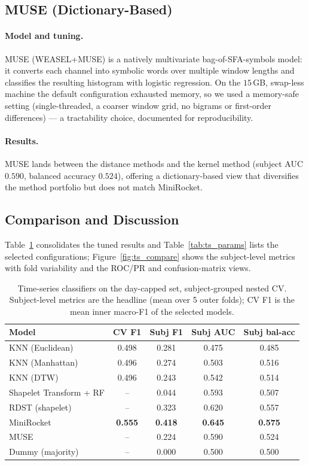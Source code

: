 \subsection{MUSE (Dictionary-Based)}
\paragraph{Model and tuning.} MUSE (WEASEL+MUSE) is a natively multivariate bag-of-SFA-symbols model: it converts each channel into symbolic words over multiple window lengths and classifies the resulting histogram with logistic regression. On the $15$\,GB, swap-less machine the default configuration exhausted memory, so we used a memory-safe setting (single-threaded, a coarser window grid, no bigrams or first-order differences) --- a tractability choice, documented for reproducibility.

\paragraph{Results.} MUSE lands between the distance methods and the kernel method (subject AUC $0.590$, balanced accuracy $0.524$), offering a dictionary-based view that diversifies the method portfolio but does not match MiniRocket.

\subsection{Comparison and Discussion}
Table~\ref{tab:ts_clf} consolidates the tuned results and Table~\ref{tab:ts_params} lists the selected configurations; Figure~\ref{fig:ts_compare} shows the subject-level metrics with fold variability and the ROC/PR and confusion-matrix views.

\begin{table}[H]
\centering
\small
\caption{Time-series classifiers on the day-capped set, subject-grouped nested CV. Subject-level metrics are the headline (mean over 5 outer folds); CV F1 is the mean inner macro-F1 of the selected models.}
\label{tab:ts_clf}
\begin{tabular}{l c c c c}
\hline
Model & CV F1 & Subj F1 & Subj AUC & Subj bal-acc \\
\hline
KNN (Euclidean) & 0.498 & 0.281 & 0.475 & 0.485 \\
KNN (Manhattan) & 0.496 & 0.274 & 0.503 & 0.516 \\
KNN (DTW) & 0.496 & 0.243 & 0.542 & 0.514 \\
Shapelet Transform + RF & -- & 0.044 & 0.593 & 0.507 \\
RDST (shapelet) & -- & 0.323 & 0.620 & 0.557 \\
MiniRocket & \textbf{0.555} & \textbf{0.418} & \textbf{0.645} & \textbf{0.575} \\
MUSE & -- & 0.224 & 0.590 & 0.524 \\
Dummy (majority) & -- & 0.000 & 0.500 & 0.500 \\
\hline
\end{tabular}
\end{table}

